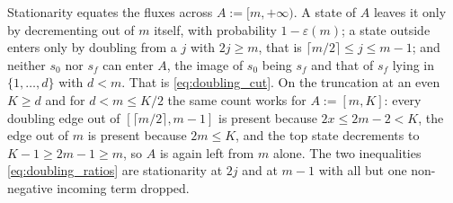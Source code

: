 Stationarity equates the fluxes across $A:=[m,+\infty)$. A state of $A$ leaves it only by
decrementing out of $m$ itself, with probability $1-\varepsilon(m)$; a state outside enters
only by doubling from a $j$ with $2j\geq m$, that is $\lceil m/2\rceil\leq j\leq m-1$; and
neither $s_0$ nor $s_f$ can enter $A$, the image of $s_0$ being $s_f$ and that of $s_f$ lying
in $\{1,\dots,d\}$ with $d<m$. That is \eqref{eq:doubling_cut}. On the truncation at an even
$K\geq d$ and for $d<m\leq K/2$ the same count works for $A:=[m,K]$: every doubling edge out
of $[\lceil m/2\rceil,m-1]$ is present because $2x\leq2m-2<K$, the edge out of $m$ is present
because $2m\leq K$, and the top state decrements to $K-1\geq2m-1\geq m$, so $A$ is again left
from $m$ alone. The two inequalities \eqref{eq:doubling_ratios} are stationarity at $2j$ and
at $m-1$ with all but one non-negative incoming term dropped.
